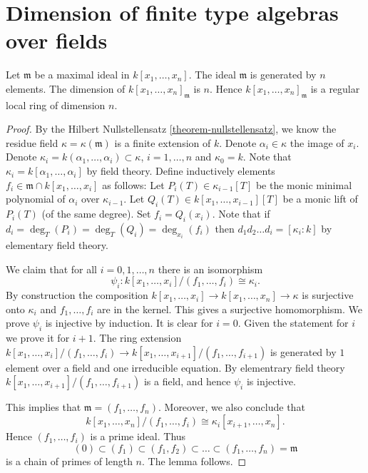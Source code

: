 \section{Dimension of finite type algebras over fields}
\label{section-dimension-finite-type-algebras}

\begin{lemma}
\label{lemma-dim-affine-space}
Let $\mathfrak m$ be a maximal ideal in $k[x_1, \ldots, x_n]$.
The ideal $\mathfrak m$ is generated by $n$ elements.
The dimension of $k[x_1, \ldots, x_n]_{\mathfrak m}$ is $n$.
Hence $k[x_1, \ldots, x_n]_{\mathfrak m}$ is a regular local
ring of dimension $n$.
\end{lemma}

\begin{proof}
By the Hilbert Nullstellensatz \ref{theorem-nullstellensatz},
we know the residue field $\kappa = \kappa(\mathfrak m)$ is
a finite extension of $k$. Denote $\alpha_i \in \kappa$ the
image of $x_i$. Denote $\kappa_i = k(\alpha_1, \ldots, \alpha_i)
\subset \kappa$, $i = 1, \ldots, n$ and $\kappa_0 = k$.
Note that $\kappa_i = k[\alpha_1, \ldots, \alpha_i]$
by field theory. Define inductively elements
$f_i \in \mathfrak m \cap k[x_1, \ldots, x_i]$
as follows: Let $P_i(T) \in \kappa_{i-1}[T]$
be the monic minimal polynomial of $\alpha_i $ over $\kappa_{i-1}$.
Let $Q_i(T) \in k[x_1, \ldots, x_{i-1}][T]$ be a monic lift of $P_i(T)$
(of the same degree). Set $f_i = Q_i(x_i)$.
Note that if $d_i = \deg_T(P_i) = \deg_T(Q_i) = \deg_{x_i}(f_i)$
then $d_1d_2\ldots d_i = [\kappa_i : k]$ by elementary field theory.

\medskip\noindent
We claim that for all $i = 0, 1, \ldots, n$ there is an
isomorphism
$$
\psi_i : k[x_1, \ldots, x_i] /(f_1, \ldots, f_i) \cong \kappa_i.
$$
By construction the composition
$k[x_1, \ldots, x_i] \to k[x_1, \ldots, x_n] \to \kappa$
is surjective onto $\kappa_i$ and $f_1, \ldots, f_i$ are
in the kernel. This gives a surjective homomorphism.
We prove $\psi_i$ is injective by induction. It is clear for $i = 0$.
Given the statement for $i$ we prove it for $i + 1$.
The ring extension $k[x_1, \ldots, x_i]/(f_1, \ldots, f_i) \to
k[x_1, \ldots, x_{i + 1}]/(f_1, \ldots, f_{i + 1})$
is generated by $1$ element over a field and one
irreducible equation. By elementrary field theory
$k[x_1, \ldots, x_{i + 1}]/(f_1, \ldots, f_{i + 1})$
is a field, and hence $\psi_i$ is injective.

\medskip\noindent
This implies that $\mathfrak m = (f_1, \ldots, f_n)$.
Moreover, we also conclude that
$$
k[x_1, \ldots, x_n]/(f_1, \ldots, f_i)
\cong
\kappa_i[x_{i + 1}, \ldots, x_n].
$$
Hence $(f_1, \ldots, f_i)$ is a prime ideal. Thus
$$
(0) \subset (f_1) \subset (f_1, f_2) \subset \ldots \subset
(f_1, \ldots, f_n) = \mathfrak m
$$
is a chain of primes of length $n$. The lemma follows.
\end{proof}

